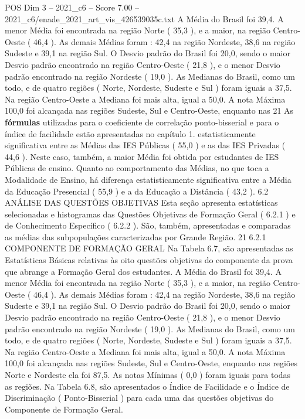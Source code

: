 \begin{textsample}{POS Dim 3 – 2021\_c6 – Score 7.00 – 2021\_c6/enade\_2021\_art\_vis\_426539035c.txt}
A Média do Brasil foi 39,4.
A menor Média foi encontrada na região Norte ( 35,3 ), e a maior, na região Centro-Oeste ( 46,4 ).
As demais Médias foram : 42,4 na região Nordeste, 38,6 na região Sudeste e 39,1 na região Sul.
O Desvio padrão do Brasil foi 20,0, sendo o maior Desvio padrão encontrado na região Centro-Oeste ( 21,8 ), e o menor Desvio padrão encontrado na região Nordeste ( 19,0 ).
As Medianas do Brasil, como um todo, e de quatro regiões ( Norte, Nordeste, Sudeste e Sul ) foram iguais a 37,5.
Na região Centro-Oeste a Mediana foi mais alta, igual a 50,0.
A nota Máxima 100,0 foi alcançada nas regiões Sudeste, Sul e Centro-Oeste, enquanto nas 21 As \textbf{fórmulas} utilizadas para o coeficiente de correlação ponto-bisserial e para o índice de facilidade estão apresentadas no capítulo 1. estatisticamente significativa entre as Médias das IES Públicas ( 55,0 ) e as das IES Privadas ( 44,6 ).
Neste caso, também, a maior Média foi obtida por estudantes de IES Públicas de ensino.
Quanto ao comportamento das Médias, no que toca a Modalidade de Ensino, há diferença estatisticamente significativa entre a Média da Educação Presencial ( 55,9 ) e a da Educação a Distância ( 43,2 ). 6.2 ANÁLISE DAS QUESTÕES OBJETIVAS Esta seção apresenta estatísticas selecionadas e histogramas das Questões Objetivas de Formação Geral ( 6.2.1 ) e de Conhecimento Específico ( 6.2.2 ).
São, também, apresentadas e comparadas as médias das subpopulações caracterizadas por Grande Região. 21 6.2.1 COMPONENTE DE FORMAÇÃO GERAL Na Tabela 6.7, são apresentadas as Estatísticas Básicas relativas às oito questões objetivas do componente da prova que abrange a Formação Geral dos estudantes.
A Média do Brasil foi 39,4.
A menor Média foi encontrada na região Norte ( 35,3 ), e a maior, na região Centro-Oeste ( 46,4 ).
As demais Médias foram : 42,4 na região Nordeste, 38,6 na região Sudeste e 39,1 na região Sul.
O Desvio padrão do Brasil foi 20,0, sendo o maior Desvio padrão encontrado na região Centro-Oeste ( 21,8 ), e o menor Desvio padrão encontrado na região Nordeste ( 19,0 ).
As Medianas do Brasil, como um todo, e de quatro regiões ( Norte, Nordeste, Sudeste e Sul ) foram iguais a 37,5.
Na região Centro-Oeste a Mediana foi mais alta, igual a 50,0.
A nota Máxima 100,0 foi alcançada nas regiões Sudeste, Sul e Centro-Oeste, enquanto nas regiões Norte e Nordeste ela foi 87,5.
As notas Mínimas ( 0,0 ) foram iguais para todas as regiões.
Na Tabela 6.8, são apresentados o Índice de Facilidade e o Índice de Discriminação ( Ponto-Bisserial ) para cada uma das questões objetivas do Componente de Formação Geral.

\end{textsample}
